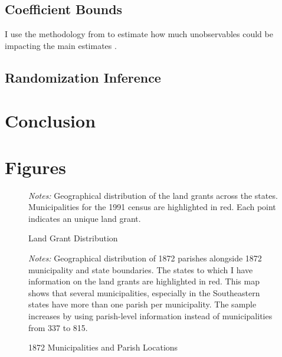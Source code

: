 \documentclass{article}
\begin{document}
\subsection{Coefficient Bounds}

I use the methodology from to estimate how much unobservables could be impacting the main estimates \textcite{Masten2022-bg}.

\subsection{Randomization Inference}

\section{Conclusion}

\clearpage



\printbibliography

\clearpage

\section*{Figures}

\begin{figure}[h!]
  \caption{Land Grant Distribution}
  \begin{center}
  \end{center}
  \textit{Notes:} Geographical distribution of the land grants across the states. Municipalities for the 1991 census are highlighted in red. Each point indicates an unique land grant. 
  \label{fig:land_grants_distribution}
\end{figure}

\begin{figure}[h!]
  \caption{1872 Municipalities and Parish Locations}
  \begin{center}
  \end{center}
  \textit{Notes:} Geographical distribution of 1872 parishes alongside 1872 municipality and state boundaries. The states to which I have information on the land grants are highlighted in red. This map shows that several municipalities, especially in the Southeastern states have more than one parish per municipality. The sample increases by using parish-level information instead of municipalities from 337 to 815.
  \label{fig:parishes_1872}
\end{figure}
\end{document}
